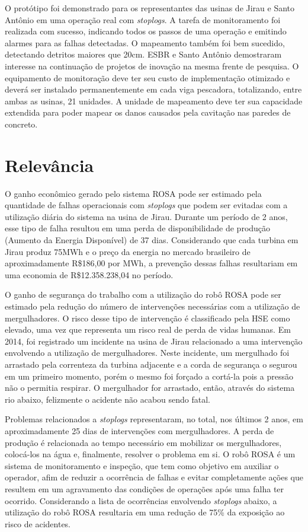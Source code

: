 O protótipo foi demonstrado para os representantes das usinas de Jirau e Santo
Antônio em uma operação real com \textit{stoplogs}. A tarefa de monitoramento
foi realizada com sucesso, indicando todos os passos de uma operação e emitindo
alarmes para as falhas detectadas. O mapeamento também foi bem sucedido,
detectando detritos maiores que 20cm. ESBR e Santo Antônio demostraram interesse
na continuação de projetos de inovação na mesma frente de pesquisa. O
equipamento de monitoração deve ter seu custo de implementação otimizado e
deverá ser instalado permanentemente em cada viga pescadora, totalizando, entre
ambas as usinas, 21 unidades. A unidade de mapeamento deve ter sua capacidade
extendida para poder mapear os danos causados pela cavitação nas paredes de
concreto.
 
\section{Relevância}

O ganho econômico gerado pelo sistema ROSA pode ser estimado pela quantidade de
falhas operacionais com \textit{stoplogs} que podem ser evitadas com a
utilização diária do sistema na usina de Jirau. Durante um período de 2 anos,
esse tipo de falha resultou em uma perda de
disponibilidade de produção (Aumento da Energia Disponível) de 37 dias.
Considerando que cada turbina em Jirau produz 75MWh e o preço da
energia no mercado brasileiro de aproximadamente R\$186,00 por MWh, a prevenção 
dessas falhas resultariam em uma economia de R\$12.358.238,04 no período.

O ganho de segurança do trabalho com a utilização do robô ROSA pode ser estimado
pela redução do número de intervenções necessárias com a utilização de
mergulhadores. O risco desse tipo de intervenção é classificado pela HSE como
elevado, uma vez que representa um risco real de perda de vidas humanas. Em
2014, foi registrado um incidente na usina de Jirau relacionado a uma
intervenção envolvendo a utilização de mergulhadores. Neste incidente, um
mergulhado foi arrastado pela correnteza da turbina adjacente e a corda de
segurança o segurou em um primeiro momento, porém o mesmo foi forçado a cortá-la
pois a pressão não o permitia respirar. O mergulhador for arrastado, então,
através do sistema rio abaixo, felizmente o acidente não acabou sendo fatal.

Problemas relacionados a \textit{stoplogs} representaram, no total, nos últimos
2 anos, em aproximadamente 25 dias de intervenções com mergulhadores. A perda de 
produção é relacionada ao tempo necessário em mobilizar os
mergulhadores, colocá-los na água e, finalmente, resolver o problema em si. O
robô ROSA é um sistema de monitoramento e inspeção, que tem como objetivo
em auxiliar o operador, afim de reduzir a ocorrência de falhas e evitar
completamente ações que resultem em um agravamento das condições de operações
após uma falha ter ocorrido. Considerando a lista de ocorrências 
envolvendo \textit{stoplogs} abaixo, a utilização do robô ROSA
resultaria em uma redução de 75\% da exposição ao risco de acidentes. 

